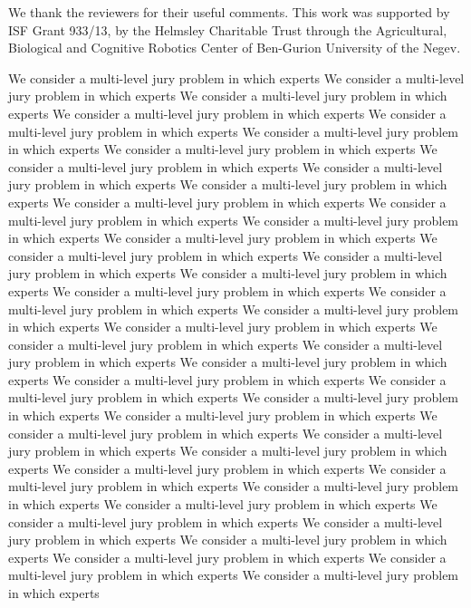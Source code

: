 \documentclass[letterpaper]{article}
\theoremstyle{definition}
\begin{document}
 We thank the reviewers for their useful comments. This work was supported by ISF Grant 933/13, by the Helmsley Charitable Trust through the Agricultural, Biological and Cognitive Robotics Center of Ben-Gurion University of the Negev.


We consider a multi-level jury problem in which experts
We consider a multi-level jury problem in which experts
We consider a multi-level jury problem in which experts
We consider a multi-level jury problem in which experts
We consider a multi-level jury problem in which experts
We consider a multi-level jury problem in which experts
We consider a multi-level jury problem in which experts
We consider a multi-level jury problem in which experts
We consider a multi-level jury problem in which experts
We consider a multi-level jury problem in which experts
We consider a multi-level jury problem in which experts
We consider a multi-level jury problem in which experts
We consider a multi-level jury problem in which experts
We consider a multi-level jury problem in which experts
We consider a multi-level jury problem in which experts
We consider a multi-level jury problem in which experts
We consider a multi-level jury problem in which experts
We consider a multi-level jury problem in which experts
We consider a multi-level jury problem in which experts
We consider a multi-level jury problem in which experts
We consider a multi-level jury problem in which experts
We consider a multi-level jury problem in which experts
We consider a multi-level jury problem in which experts
We consider a multi-level jury problem in which experts
We consider a multi-level jury problem in which experts
We consider a multi-level jury problem in which experts
We consider a multi-level jury problem in which experts
We consider a multi-level jury problem in which experts
We consider a multi-level jury problem in which experts
We consider a multi-level jury problem in which experts
We consider a multi-level jury problem in which experts
We consider a multi-level jury problem in which experts
We consider a multi-level jury problem in which experts
We consider a multi-level jury problem in which experts
We consider a multi-level jury problem in which experts
We consider a multi-level jury problem in which experts
We consider a multi-level jury problem in which experts
We consider a multi-level jury problem in which experts
We consider a multi-level jury problem in which experts
We consider a multi-level jury problem in which experts
We consider a multi-level jury problem in which experts
\end{document}

